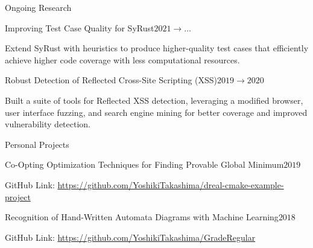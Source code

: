 \documentclass{resume} %
\begin{document}
\begin{rSection}{Ongoing Research}
  \begin{rSubsection}{Improving Test Case Quality for SyRust}{$2021
      \rightarrow \ldots$}{}{}
  \item Extend SyRust with heuristics to produce higher-quality test
    cases that efficiently achieve higher code coverage with less
    computational resources.
  \end{rSubsection}
  \begin{rSubsection}{Robust Detection of Reflected Cross-Site
      Scripting (XSS)}{$2019 \rightarrow 2020$}{}{}
  \item Built a suite of tools for Reflected XSS detection,
    leveraging a modified browser, user interface fuzzing, and search
    engine mining for better coverage and improved vulnerability
    detection.
  \end{rSubsection}
\end{rSection}


\begin{rSection}{Personal Projects}
  \begin{rSubsection}{Co-Opting Optimization Techniques for Finding
      Provable Global Minimum}{$2019$}{}{}
  \item GitHub Link:
    \href{https://github.com/YoshikiTakashima/dreal-cmake-example-project}
    {https://github.com/YoshikiTakashima/dreal-cmake-example-project}
  \end{rSubsection}
  \begin{rSubsection}{Recognition of Hand-Written Automata Diagrams with
      Machine Learning}{$2018$}{}{}
  \item GitHub Link:
    \href{https://github.com/YoshikiTakashima/GradeRegular}
    {https://github.com/YoshikiTakashima/GradeRegular}
  \end{rSubsection}
\end{rSection}
\end{document}
